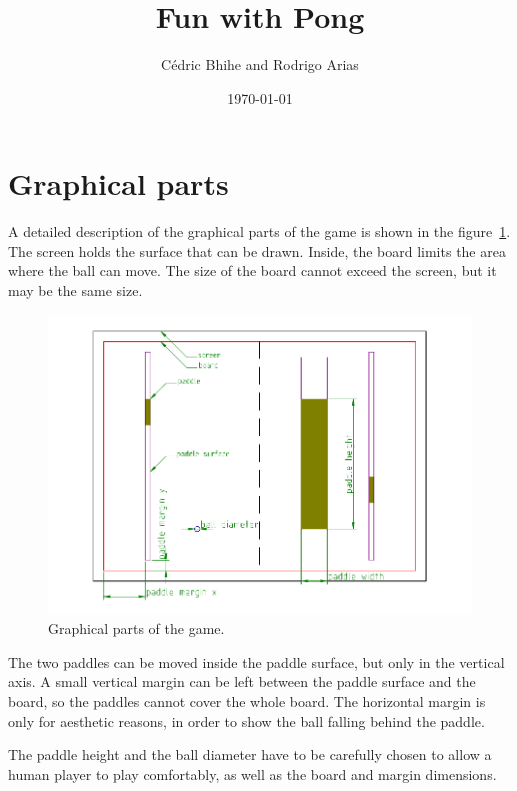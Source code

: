 \documentclass[a4paper]{article}
\title{Fun with Pong}
\author{Cédric Bhihe and Rodrigo Arias}
\date{\today}
\begin{document}
\maketitle

\section{Graphical parts}

A detailed description of the graphical parts of the game is shown in the 
figure~\ref{fig:parts}. The screen holds the surface that can be drawn. Inside, 
the board limits the area where the ball can move. The size of the board cannot 
exceed the screen, but it may be the same size.

\begin{figure}[h]
	\centering
	\includegraphics[width=\textwidth]{parts.pdf}
	\caption{Graphical parts of the game.}
	\label{fig:parts}
\end{figure}

The two paddles can be moved inside the paddle surface, but only in the vertical 
axis. A small vertical margin can be left between the paddle surface and the 
board, so the paddles cannot cover the whole board. The horizontal margin is 
only for aesthetic reasons, in order to show the ball falling behind the paddle.

The paddle height and the ball diameter have to be carefully chosen to allow a 
human player to play comfortably, as well as the board and margin dimensions.
\end{document}
